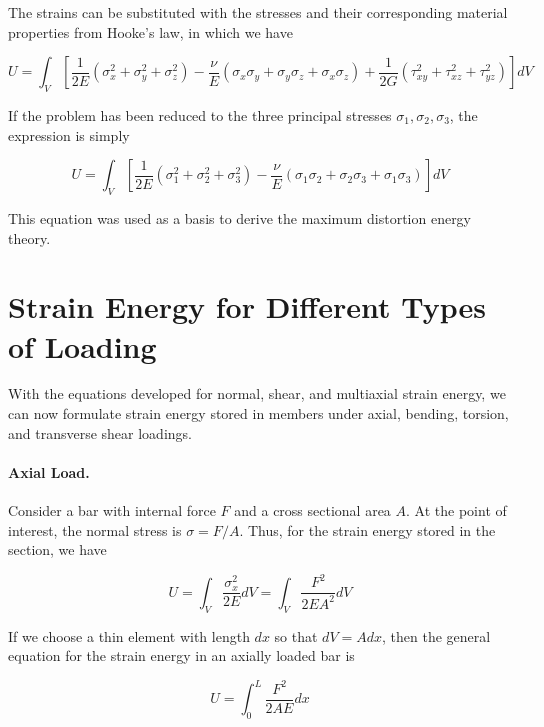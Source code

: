 \documentclass[
fontsize=10pt,
a4paper,
twosides=false,
open=any,
svgnames,
]{kaobook} %
\begin{document}
The strains can be substituted with the stresses and their corresponding material properties from Hooke's law, in which we have

\begin{equation}
  U = \int_V \left[ \frac{1}{2E} \left( \sigma_x^2 + \sigma_y^2 + \sigma_z^2 \right) - \frac{\nu}{E} \left( \sigma_x \sigma_y + \sigma_y \sigma_z + \sigma_x \sigma_z \right) + \frac{1}{2G} \left( \tau_{xy}^2 + \tau_{xz}^2 + \tau_{yz}^2 \right) \right] dV
\end{equation}

If the problem has been reduced to the three principal stresses $\sigma_1, \sigma_2, \sigma_3$, the expression is simply

\begin{equation}
  U = \int_V \left[ \frac{1}{2E} \left( \sigma_1^2 + \sigma_2^2 + \sigma_3^2 \right) - \frac{\nu}{E} \left( \sigma_1 \sigma_2 + \sigma_2 \sigma_3 + \sigma_1 \sigma_3 \right) \right] dV
\end{equation}

This equation was used as a basis to derive the maximum distortion energy theory.

\section{Strain Energy for Different Types of Loading}

With the equations developed for normal, shear, and multiaxial strain energy, we can now formulate strain energy stored in members under axial, bending, torsion, and transverse shear loadings.

\paragraph{Axial Load.}

Consider a bar with internal force $F$ and a cross sectional area $A$. At the point of interest, the normal stress is $\sigma = F / A$. Thus, for the strain energy stored in the section, we have

\begin{equation*}
  U = \int_V \frac{\sigma_x^2}{2E} dV = \int_V \frac{F^2}{2EA^2}dV
\end{equation*}

If we choose a thin element with length $dx$ so that $dV = A dx$, then the general equation for the strain energy in an axially loaded bar is

\begin{equation}
  U = \int_0^L \frac{F^2}{2AE} dx
\end{equation}
\end{document}
